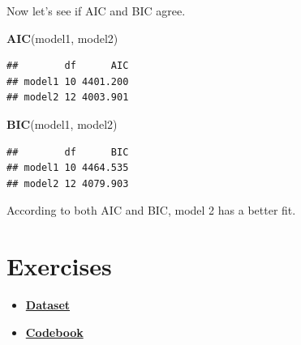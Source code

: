 \documentclass[]{article}
\newenvironment{Shaded}{\begin{snugshade}}{\end{snugshade}}
\newcommand{\KeywordTok}[1]{\textcolor[rgb]{0.13,0.29,0.53}{\textbf{{#1}}}}
\newcommand{\NormalTok}[1]{{#1}}
\providecommand{\tightlist}{%
  \setlength{\itemsep}{0pt}\setlength{\parskip}{0pt}}
\theoremstyle{definition}
\theoremstyle{definition}
\theoremstyle{remark}
\begin{document}
Now let's see if AIC and BIC agree.

\begin{Shaded}
\begin{Highlighting}[]
\KeywordTok{AIC}\NormalTok{(model1, model2)}
\end{Highlighting}
\end{Shaded}

\begin{verbatim}
##        df      AIC
## model1 10 4401.200
## model2 12 4003.901
\end{verbatim}

\begin{Shaded}
\begin{Highlighting}[]
\KeywordTok{BIC}\NormalTok{(model1, model2) }
\end{Highlighting}
\end{Shaded}

\begin{verbatim}
##        df      BIC
## model1 10 4464.535
## model2 12 4079.903
\end{verbatim}

According to both AIC and BIC, model 2 has a better fit.

\section{Exercises}\label{exercises}

\begin{itemize}
\tightlist
\item
  \textbf{\href{http://uclspp.github.io/PUBLG100/data/mroz.dta}{Dataset}}
\item
  \textbf{\href{http://uclspp.github.io/PUBLG100/data/mroz.txt}{Codebook}}
\end{itemize}
\end{document}
